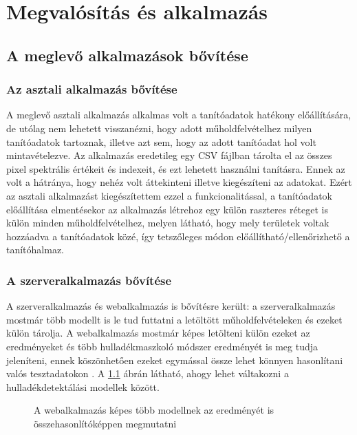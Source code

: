 \chapter{Megvalósítás és alkalmazás}
\label{ch:impl}

\section{A meglevő alkalmazások bővítése}
\label{ch:application-improvement}

\subsection {Az asztali alkalmazás bővítése}

A meglevő asztali alkalmazás alkalmas volt a tanítóadatok hatékony előállítására, de utólag nem lehetett visszanézni, hogy adott műholdfelvételhez milyen tanítóadatok tartoznak, illetve azt sem, hogy az adott tanítóadat hol volt mintavételezve. Az alkalmazás eredetileg egy CSV fájlban \cite{rfc4180} tárolta el az összes pixel spektrális értékeit és indexeit, és ezt lehetett használni tanításra. Ennek az volt a hátránya, hogy nehéz volt áttekinteni illetve kiegészíteni az adatokat. Ezért az asztali alkalmazást kiegészítettem ezzel a funkcionalitással, a tanítóadatok előállítása elmentésekor az alkalmazás létrehoz egy külön raszteres réteget is külön minden műholdfelvételhez, melyen látható, hogy mely területek voltak hozzáadva a tanítóadatok közé, így tetszőleges módon előállítható/ellenőrizhető a tanítóhalmaz.

\subsection {A szerveralkalmazás bővítése}

A szerveralkalmazás és webalkalmazás is bővítésre került: a szerveralkalmazás mostmár több modellt is le tud futtatni a letöltött műholdfelvételeken és ezeket külön tárolja. A webalkalmazás mostmár képes letölteni külön ezeket az eredményeket és több hulladékmaszkoló módszer eredményét is meg tudja jeleníteni, ennek köszönhetően ezeket egymással össze lehet könnyen hasonlítani valós tesztadatokon . A \ref{fig:waste-detection-demo} ábrán látható, ahogy lehet váltakozni a hulladékdetektálási modellek között.

\begin{figure}[H]
	\centering
	\hspace{5pt}
	\caption{A webalkalmazás képes több modellnek az eredményét is összehasonlítóképpen megmutatni}
	\label{fig:waste-detection-demo}
\end{figure}

